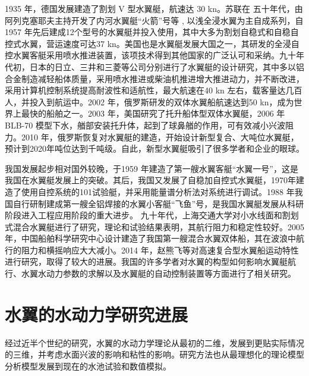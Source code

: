 \documentclass[10.5pt,twocolumn]{jbuaa}
\begin{document}
1935 年，德国发展建造了割划 V 型水翼艇，航速达 30 kn。苏联在 五十年代，由阿列克塞耶夫主持开发了内河水翼艇“火箭”号等 , 以浅全浸水翼为主自成系列，自 1957 年先后建成12个型号的水翼艇并投入使用，其中大多为割划自稳式和自稳自控式水翼，营运速度可达37 kn。美国也是水翼艇发展大国之一，其研发的全浸自控水翼客艇采用喷水推进装置，该项技术得到其他国家的广泛认可和采纳。九十年代初，日本的日立、三井和三菱等公司分别进行了水翼艇的设计研究，其中多以铝合金制造减轻船体质量，采用喷水推进或柴油机推进增大推进动力，并不断改进，采用计算机控制系统提高耐波性和适航性，最大航速在40 kn 左右，载客量达几百人，并投入到航运中。2002 年，俄罗斯研发的双体水翼船航速达到50 kn，成为世界上最快的船舶之一。2003 年，美国研究了托升船体型双体水翼艇，2006 年 BLB-70 模型下水，艏部安装托升体，起到了球鼻艏的作用，可有效减小兴波阻力。2010 年，俄罗斯恢复对水翼艇的建造，开始设计新型复合、大吨位水翼艇，预计到2020年吨位达到千吨级。自此，新型水翼艇吸引了很多学者和企业的眼球。

我国发展起步相对国外较晚，于1959 年建造了第一艘水翼客艇“水翼一号”，这是我国在水翼艇发展上的突破。其后，我国又发展了自稳加自控式水翼艇，1970年建造了使用自控系统的101试验艇，并采用能量谱分析法对系统进行调试。1988 年我国自行研制建成第一艘全铝焊接的水翼小客艇“飞鱼”号，是我国水翼艇发展从科研阶段进入工程应用阶段的重大进步。 九十年代，上海交通大学对小水线面和割划式混合水翼艇进行了研究，理论和试验结果表明，其航行阻力和稳定性较好。2005 年，中国船舶科学研究中心设计建造了我国第一艘混合水翼双体船，其在波浪中航行的阻力和横摇响应大大减小。2014 年，赵熊飞等对高速复合型水翼船运动特性进行研究，取得了较大的进展。我国的许多学者对水翼的构型如何影响水翼艇航行、水翼水动力参数的求解以及水翼艇的自动控制装置等方面进行了相关研究。


\section{水翼的水动力学研究进展}
经过近半个世纪的研究，水翼的水动力学理论从最初的二维，发展到更贴实际情况的三维，并考虑水面兴波的影响和粘性的影响。研究方法也从最理想化的理论模型分析模型发展到现在的水池试验和数值模拟。
\end{document}
